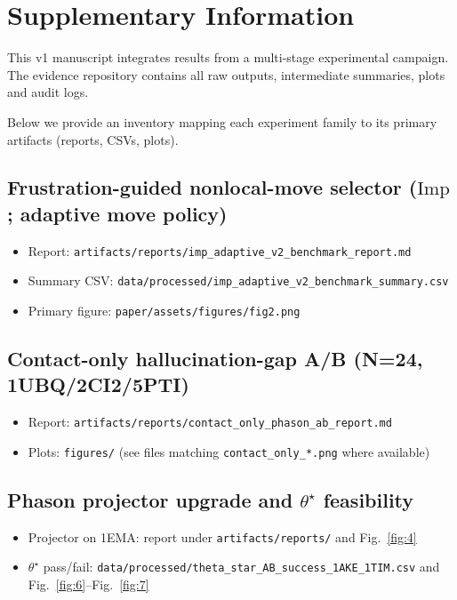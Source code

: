 \section*{Supplementary Information}

This v1 manuscript integrates results from a multi-stage experimental campaign. The evidence repository contains all raw outputs, intermediate summaries, plots and audit logs.

Below we provide an inventory mapping each experiment family to its primary artifacts (reports, CSVs, plots).

\subsection*{Frustration-guided nonlocal-move selector ($\mathrm{Imp}$; adaptive move policy)}
\begin{itemize}
  \item Report: \texttt{artifacts/reports/imp\_adaptive\_v2\_benchmark\_report.md}
  \item Summary CSV: \texttt{data/processed/imp\_adaptive\_v2\_benchmark\_summary.csv}
  \item Primary figure: \texttt{paper/assets/figures/fig2.png}
\end{itemize}

\subsection*{Contact-only hallucination-gap A/B (N=24, 1UBQ/2CI2/5PTI)}
\begin{itemize}
  \item Report: \texttt{artifacts/reports/contact\_only\_phason\_ab\_report.md}
  \item Plots: \texttt{figures/} (see files matching \texttt{contact\_only\_*.png} where available)
\end{itemize}

\subsection*{Phason projector upgrade and $\theta^\star$ feasibility}
\begin{itemize}
  \item Projector on 1EMA: report under \texttt{artifacts/reports/} and Fig.~\ref{fig:4}
  \item $\theta^\star$ pass/fail: \texttt{data/processed/theta\_star\_AB\_success\_1AKE\_1TIM.csv} and Fig.~\ref{fig:6}--Fig.~\ref{fig:7}
\end{itemize}

